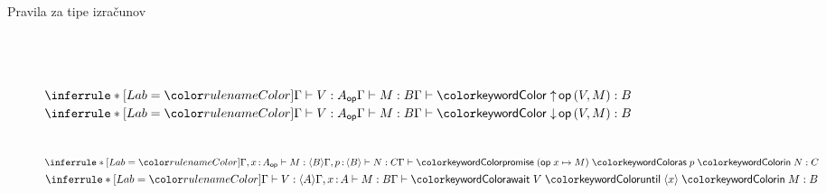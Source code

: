 \documentclass{beamer}
\theoremstyle{definition} %
\theoremstyle{plain} %
\begin{document}
	\begin{frame}{Pravila za tipe izračunov}
		\begin{figure}[tp]
			\centering
			\tiny
			\begin{mathpar}
				\qquad
				\qquad
				\\
				\qquad
				\\
				\\
				\colorbox{kost}{$
					\coopinfer{}{
						\Gamma \types V : A_\op \\
						\Gamma \types M : B 
					}{
						\Gamma \types \tmopout{op}{V}{M} : B
					}	
				$}
				\qquad
				\colorbox{kost}{$
					\coopinfer{}{
						\Gamma \types V : A_\op \\
						\Gamma \types M : B 
					}{
						\Gamma \types \tmopin{op}{V}{M} : B
					}	
					$}

				\\
				\colorbox{kost}{$
					\coopinfer{}{
						\Gamma, x \of A_\op \types M : \typromise B \\
						\Gamma, p \of \typromise B \types N : C 
					}{
						\Gamma \types \tmwith{op}{x}{M}{p}{N} : C
					}	
				$}
				\\
				\colorbox{kost}{$
					\coopinfer{}{
						\Gamma \types V : \typromise A \\
						\Gamma, x \of A \types M : B 
					}{
						\Gamma \types \tmawait{V}{x}{M} : B
					}	
				$}
				
			\end{mathpar}
		\end{figure}
	\end{frame}
\end{document}

